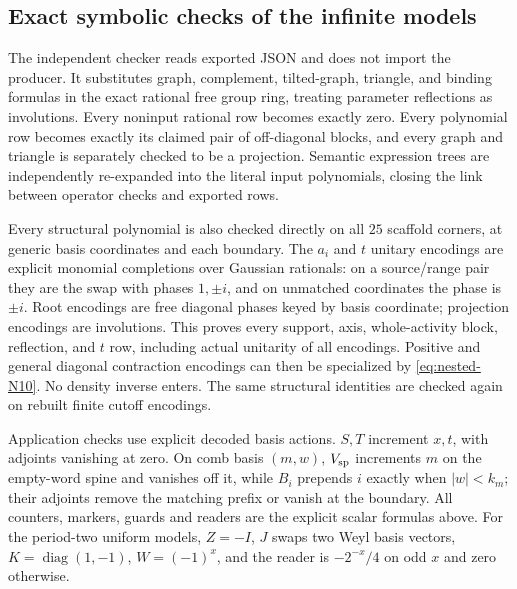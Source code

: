 \subsection{Exact symbolic checks of the infinite models}
The independent checker reads exported JSON and does not import the
producer. It substitutes graph, complement, tilted-graph, triangle,
and binding formulas in the exact rational free group ring, treating
parameter reflections as involutions. Every noninput rational row
becomes exactly zero. Every polynomial row becomes exactly its
claimed pair of off-diagonal blocks, and every graph and triangle is
separately checked to be a projection. Semantic expression trees are
independently re-expanded into the literal input polynomials, closing
the link between operator checks and exported rows.

Every structural polynomial is also checked directly on all $25$
scaffold corners, at generic basis coordinates and each boundary.
The $a_i$ and $t$ unitary encodings are explicit monomial completions
over Gaussian rationals: on a source/range pair they are the swap
with phases $1,\pm i$, and on unmatched coordinates the phase is
$\pm i$. Root encodings are free diagonal phases keyed by basis coordinate;
projection encodings are involutions. This proves every support,
axis, whole-activity block, reflection, and $t$ row, including actual
unitarity of all encodings. Positive and general diagonal contraction
encodings can then be specialized by \eqref{eq:nested-N10}. No density inverse enters.
The same structural identities are checked again on rebuilt finite
cutoff encodings.

Application checks use explicit decoded basis actions. $S,T$
increment $x,t$, with adjoints vanishing at zero. On comb basis
$(m,w)$, ${V_{\rm sp}}$ increments $m$ on the empty-word spine and vanishes off
it, while $B_i$ prepends $i$ exactly when $|w|<k_m$; their adjoints
remove the matching prefix or vanish at the boundary. All counters,
markers, guards and readers are the explicit scalar formulas above.
For the period-two uniform models, $Z=-I$, $J$ swaps two Weyl basis
vectors, $K=\operatorname{diag}(1,-1)$, $W=(-1)^x$, and the reader is
$-2^{-x}/4$ on odd $x$ and zero otherwise.

